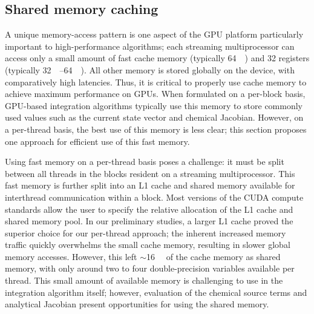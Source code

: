 \documentclass[final,twocolumn]{elsarticle}
\begin{document}
\subsection{Shared memory caching}
\label{S:smem_present}

A unique memory-access pattern is one aspect of the GPU platform particularly important to high-performance algorithms; each streaming multiprocessor can access only a small amount of fast cache memory (typically \SI{64}{\kilo\byte}) and \SI{32}{\bit} registers (typically \SIrange{32}{64}{\kilo\byte}).
All other memory is stored globally on the device, with comparatively high latencies.
Thus, it is critical to properly use cache memory to achieve maximum performance on GPUs.
When formulated on a per-block basis, GPU-based integration algorithms typically use this memory to store commonly used values such as the current state vector and  chemical Jacobian.
However, on a per-thread basis, the best use of this memory is less clear; this section proposes one approach for efficient use of this fast memory.

Using fast memory on a per-thread basis poses a challenge: it must be split between all threads in the blocks resident on a streaming multiprocessor.
This fast memory is further split into an L1 cache and shared memory available for interthread communication within a block.
Most versions of the CUDA compute standards allow the user to specify the relative allocation of the L1 cache and shared memory pool.
In our preliminary studies, a larger L1 cache proved the superior choice for our per-thread approach; the inherent increased memory traffic quickly overwhelms the small cache memory, resulting in slower global memory accesses.
However, this left $\sim$\SI{16}{\kilo\byte} of the cache memory as shared memory, with only around two to four double-precision variables available per thread.
This small amount of available memory is challenging to use in the integration algorithm itself; however, evaluation of the chemical source terms and analytical Jacobian present opportunities for using the shared memory.
\end{document}
